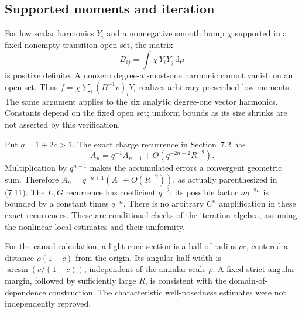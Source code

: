 \documentclass[10pt]{article}
\begin{document}
\subsection*{Supported moments and iteration}
For low scalar harmonics \(Y_i\) and a nonnegative smooth bump \(\chi\) supported in a fixed nonempty transition open set, the matrix \[B_{ij}=\int\chi\,Y_iY_j\,\mathrm d\mu\] is positive definite. A nonzero degree-at-most-one harmonic cannot vanish on an open set. Thus \(f=\chi\sum_i(B^{-1}v)_iY_i\) realizes arbitrary prescribed low moments. The same argument applies to the six analytic degree-one vector harmonics. Constants depend on the fixed open set; uniform bounds as its size shrinks are not asserted by this verification.\par
Put \(q=1+2c>1\). The exact charge recurrence in Section 7.2 has \[A_n=q^{-1}A_{n-1}+O(q^{-2n+2}R^{-2}).\] Multiplication by \(q^{n-1}\) makes the accumulated errors a convergent geometric sum. Therefore \(A_n=q^{-n+1}(A_1+O(R^{-2}))\), as actually parenthesized in (7.11). The \(L,G\) recurrence has coefficient \(q^{-2}\); its possible factor \(nq^{-2n}\) is bounded by a constant times \(q^{-n}\). There is no arbitrary \(C^n\) amplification in these exact recurrences. These are conditional checks of the iteration algebra, assuming the nonlinear local estimates and their uniformity.\par
For the causal calculation, a light-cone section is a ball of radius \(\rho c\), centered a distance \(\rho(1+c)\) from the origin. Its angular half-width is \(\arcsin(c/(1+c))\), independent of the annular scale \(\rho\). A fixed strict angular margin, followed by sufficiently large \(R\), is consistent with the domain-of-dependence construction. The characteristic well-posedness estimates were not independently reproved.\par
\end{document}
